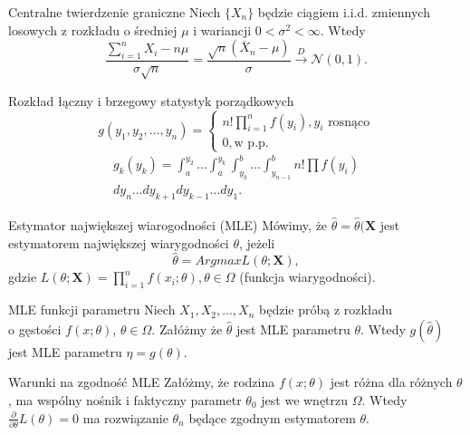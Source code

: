 \documentclass[avery5371, grid, frame]{flashcards}
\begin{document}
\begin{flashcard}[Twierdzenie]{Centralne twierdzenie graniczne}
    Niech $\{X_n\}$ będzie ciągiem i.i.d. zmiennych losowych z rozkładu o średniej $\mu$ i wariancji $0 < \sigma^2 < \infty$. Wtedy $$ \frac{\sum_{i=1}^{n} X_i - n\mu}{\sigma \sqrt{n}} = \frac{\sqrt{n}(\overline{X}_n - \mu)}{\sigma} \xrightarrow{D} \mathcal{N}(0, 1).$$
\end{flashcard}

\begin{flashcard}[Twierdzenie]{Rozkład łączny i brzegowy statystyk porządkowych}
    $$ g(y_1, y_2, \dots, y_n) =
    \begin{cases}
        n! \prod_{i=1}^{n}f(y_i), y_i \text{ rosnąco} \\
        0, \text{w p.p.}
    \end{cases} $$
    \begin{align*}
        g_k(y_k) = \int_a^{y_2} \dots \int_a^{y_k} \int_{y_k}^b \dots \int_{y_{n-1}}^b n! \prod f(y_i) \\ dy_n \dots dy_{k+1} dy_{k-1} \dots dy_1.
    \end{align*}
\end{flashcard}

\begin{flashcard}[Definicja]{Estymator największej wiarogodności (MLE)}
    Mówimy, że $\hat{\theta} = \hat{\theta}(\mathbf{X}$ jest estymatorem największej wiarygodności $\theta$, jeżeli $$ \hat{\theta} = Argmax L(\theta; \mathbf{X}),$$ gdzie $ L(\theta;\textbf{X}) = \prod_{i=1}^n f(x_i; \theta), \theta \in \Omega$ (funkcja wiarygodności).
\end{flashcard}

\begin{flashcard}[Twierdzenie]{MLE funkcji parametru}
    Niech $X_1, X_2, \dots, X_n$ będzie próbą z rozkładu \\ o gęstości $f(x; \theta)$, $\theta \in \Omega$. Załóżmy że $\hat{\theta}$ jest MLE parametru $\theta$. Wtedy $g(\hat{\theta})$ jest MLE parametru $\eta = g(\theta)$.
\end{flashcard}

\begin{flashcard}[Twierdzenie]{Warunki na zgodność MLE}
    Załóżmy, że rodzina $f(x;\theta)$ jest różna dla różnych $\theta$, ma wspólny nośnik i faktyczny parametr $\theta_0$ jest we wnętrzu $\Omega$. Wtedy $ \frac{\partial}{\partial \theta} L(\theta) = 0 $ ma rozwiązanie $\theta_n$ będące zgodnym estymatorem $\theta$.
\end{flashcard}
\end{document}
